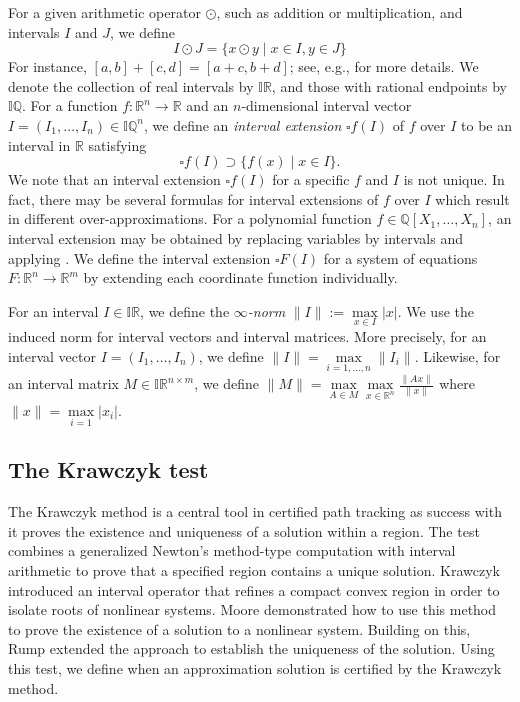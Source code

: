 For a given arithmetic operator $\odot$, such as addition or multiplication, and intervals $I$ and $J$, we define 
\begin{equation}\label{eq:interval_arithmetic}
    I\odot J=\{x\odot y\mid x\in I, y\in J\}
\end{equation}
For instance, $[a,b]+[c,d]=[a+c,b+d]$; see, e.g., \cite{moore2009introduction} for more details.  We denote the collection of real intervals by $\mathbb{IR}$, and those with rational endpoints by $\mathbb{IQ}$. For a function $f:\mathbb{R}^n\rightarrow \mathbb{R}$ and an $n$-dimensional interval vector $I=(I_1,\dots, I_n)\in \mathbb{IQ}^n$, we define an \emph{interval extension} $\square f(I)$ of $f$ over $I$ to be an interval in $\mathbb{R}$ satisfying 
\[\square f(I)\supset \{f(x)\mid x\in I\}.\]
We note that an interval extension $\square f(I)$ for a specific $f$ and $I$ is not unique.  In fact, there may be several formulas for interval extensions of $f$ over $I$ which result in different over-approximations.  For a polynomial function $f\in \mathbb{Q}[X_1,\dots, X_n]$, an interval extension may be obtained by replacing variables by intervals and applying . We define the interval extension $\square F(I)$ for a system of equations $F:\mathbb{R}^n\rightarrow \mathbb{R}^m$ by extending each coordinate function individually.

For an interval $I\in \mathbb{IR}$, we define the \emph{$\infty$-norm}  $\|I\|:=\max\limits_{x\in I}|x|$. We use the induced norm for interval vectors and interval matrices.  More precisely, for an interval vector $I=(I_1,\dots, I_n)$, we define $\|I\|=\max\limits_{i=1,\dots, n}\|I_i\|$. Likewise, for an interval matrix $M\in\mathbb{IR}^{n\times m}$, we define $\|M\|=\max\limits_{A\in M}\max\limits_{x\in \mathbb{R}^n}\frac{\|Ax\|}{\|x\|}$ where $\|x\|=\max\limits_{i=1}|x_i|$.

\subsection{The Krawczyk test}
The Krawczyk method is a central tool in certified path tracking as success with it proves the existence and uniqueness of a solution within a region.  The test combines a generalized Newton's method-type computation with interval arithmetic to prove that a specified region contains a unique solution.  Krawczyk \cite{krawczyk1969newton} introduced an interval operator that refines a compact convex region in order to isolate roots of nonlinear systems.  Moore \cite{moore1977test} demonstrated how to use this method to prove the existence of a solution to a nonlinear system. Building on this, Rump \cite{rump1983solving} extended the approach to establish the uniqueness of the solution.  Using this test, we define when an approximation solution is certified by the Krawczyk method.

